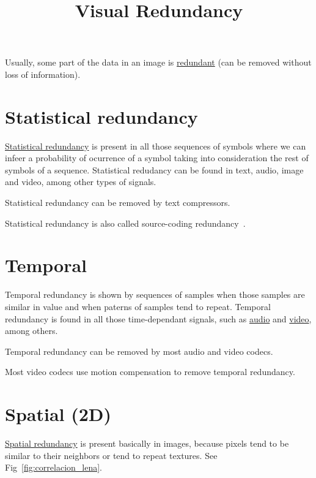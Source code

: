 
\title{Visual Redundancy}

\maketitle
\tableofcontents

Usually, some part of the data in an image is
\href{https://en.wikipedia.org/wiki/Data_redundancy}{redundant} (can
be removed without loss of information).

\section{Statistical redundancy}
\href{https://en.wikipedia.org/wiki/Redundancy_(information_theory)}{Statistical
  redundancy} is present in all those sequences of symbols where we
can infeer a probability of ocurrence of a symbol taking into
consideration the rest of symbols of a sequence. Statistical redudancy
can be found in text, audio, image and video, among other types of
signals.

Statistical redundancy can be removed by text compressors.

Statistical redundancy is also called source-coding redundancy~\cite{kondoz2009visual}.

\section{Temporal}
Temporal redundancy is shown by sequences of samples when those
samples are similar in value and when paterns of samples tend to
repeat. Temporal redundancy is found in all those time-dependant
signals, such as
\href{https://en.wikipedia.org/wiki/Inter_frame}{audio} and
\href{https://en.wikipedia.org/wiki/Inter_frame}{video}, among others.

Temporal redundancy can be removed by most audio and video codecs.

Most video codecs use motion compensation to remove temporal redundancy.

\section{Spatial (2D)}
\href{https://robbfoxx.wordpress.com/2015/07/12/discussion-6-2-1-what-is-redundancy-temporal-redundancy-and-spatial-redundancy/}{Spatial
  redundancy} is present basically in images, because pixels tend to
be similar to their neighbors or tend to repeat textures. See
Fig~\ref{fig:correlacion_lena}.

